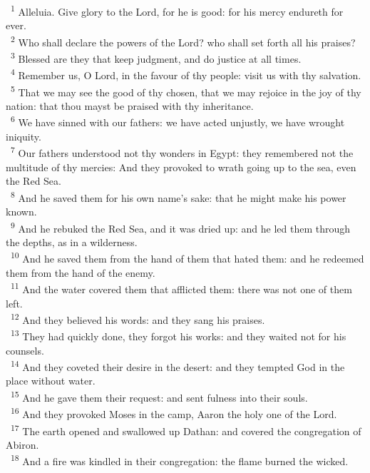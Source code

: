 \documentclass[a5paper,12pt]{article}
\begin{document}
\begin{multicols*}{2}
~\textsuperscript{1} Alleluia. Give glory to the Lord, for he is good: for his mercy endureth for ever.\\
~\textsuperscript{2} Who shall declare the powers of the Lord? who shall set forth all his praises?\\
~\textsuperscript{3} Blessed are they that keep judgment, and do justice at all times.\\
~\textsuperscript{4} Remember us, O Lord, in the favour of thy people: visit us with thy salvation.\\
~\textsuperscript{5} That we may see the good of thy chosen, that we may rejoice in the joy of thy nation: that thou mayst be praised with thy inheritance.\\
~\textsuperscript{6} We have sinned with our fathers: we have acted unjustly, we have wrought iniquity.\\
~\textsuperscript{7} Our fathers understood not thy wonders in Egypt: they remembered not the multitude of thy mercies: And they provoked to wrath going up to the sea, even the Red Sea.\\
~\textsuperscript{8} And he saved them for his own name's sake: that he might make his power known.\\
~\textsuperscript{9} And he rebuked the Red Sea, and it was dried up: and he led them through the depths, as in a wilderness.\\
~\textsuperscript{10} And he saved them from the hand of them that hated them: and he redeemed them from the hand of the enemy.\\
~\textsuperscript{11} And the water covered them that afflicted them: there was not one of them left.\\
~\textsuperscript{12} And they believed his words: and they sang his praises.\\
~\textsuperscript{13} They had quickly done, they forgot his works: and they waited not for his counsels.\\
~\textsuperscript{14} And they coveted their desire in the desert: and they tempted God in the place without water.\\
~\textsuperscript{15} And he gave them their request: and sent fulness into their souls.\\
~\textsuperscript{16} And they provoked Moses in the camp, Aaron the holy one of the Lord.\\
~\textsuperscript{17} The earth opened and swallowed up Dathan: and covered the congregation of Abiron.\\
~\textsuperscript{18} And a fire was kindled in their congregation: the flame burned the wicked.\\

\end{multicols*}
\end{document}
